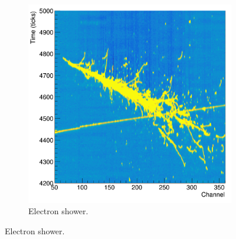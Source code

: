 \begin{figure}
\begin{subfigure}[b]{0.49\textwidth}
		\includegraphics[width=\textwidth]{figures/electron_signature.png}
		\caption{Electron shower.}
		\label{fig:electron_signature}
	\end{subfigure}


\end{figure}
